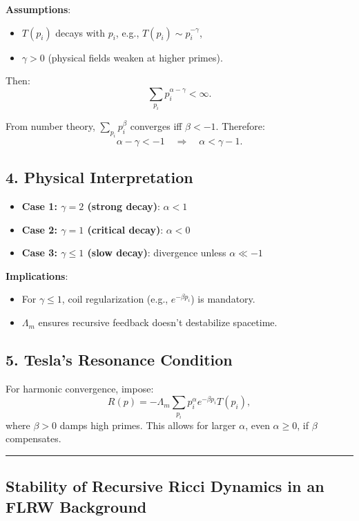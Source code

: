 \documentclass[12pt]{article}
\theoremstyle{plain}
\begin{document}
\textbf{Assumptions}:
\begin{itemize}
    \item \( T(p_i) \) decays with \( p_i \), e.g., \( T(p_i) \sim p_i^{-\gamma} \),
    \item \( \gamma > 0 \) (physical fields weaken at higher primes).
\end{itemize}

Then:
\[
\sum_{p_i} p_i^{\alpha - \gamma} < \infty.
\]

From number theory, \( \sum_{p_i} p_i^\beta \) converges iff \( \beta < -1 \). Therefore:
\[
\alpha - \gamma < -1 \quad \Rightarrow \quad \boxed{\alpha < \gamma - 1}.
\]

\subsection*{4. Physical Interpretation}

\begin{itemize}
    \item \textbf{Case 1: \( \gamma = 2 \) (strong decay)}: \( \alpha < 1 \)
    \item \textbf{Case 2: \( \gamma = 1 \) (critical decay)}: \( \alpha < 0 \)
    \item \textbf{Case 3: \( \gamma \leq 1 \) (slow decay)}: divergence unless \( \alpha \ll -1 \)
\end{itemize}

\textbf{Implications}:
\begin{itemize}
    \item For \( \gamma \leq 1 \), coil regularization (e.g., \( e^{-\beta p_i} \)) is mandatory.
    \item \( \Lambda_m \) ensures recursive feedback doesn’t destabilize spacetime.
\end{itemize}

\subsection*{5. Tesla’s Resonance Condition}

For harmonic convergence, impose:
\[
R(p) = -\Lambda_m \sum_{p_i} p_i^\alpha e^{-\beta p_i} T(p_i),
\]
where \( \beta > 0 \) damps high primes. This allows for larger \( \alpha \), even \( \alpha \geq 0 \), if \( \beta \) compensates.

\vspace{1em}
\hrule
\vspace{1em}

\subsection{Stability of Recursive Ricci Dynamics in an FLRW Background}
\end{document}
